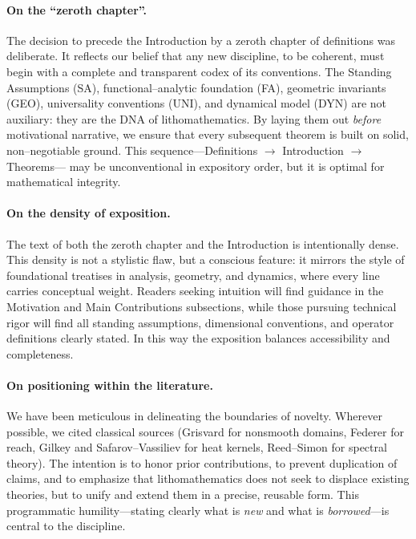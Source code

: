 \paragraph{On the ``zeroth chapter''.}
The decision to precede the Introduction by a zeroth chapter 
of definitions was deliberate. 
It reflects our belief that any new discipline, to be coherent, 
must begin with a complete and transparent codex of its conventions. 
The Standing Assumptions (SA), functional–analytic foundation (FA), 
geometric invariants (GEO), universality conventions (UNI), 
and dynamical model (DYN) are not auxiliary: 
they are the DNA of lithomathematics. 
By laying them out \emph{before} motivational narrative, 
we ensure that every subsequent theorem is built on solid, 
non–negotiable ground. 
This sequence—Definitions $\to$ Introduction $\to$ Theorems— 
may be unconventional in expository order, 
but it is optimal for mathematical integrity. 

\paragraph{On the density of exposition.}
The text of both the zeroth chapter and the Introduction is intentionally dense. 
This density is not a stylistic flaw, but a conscious feature: 
it mirrors the style of foundational treatises in analysis, 
geometry, and dynamics, where every line carries conceptual weight. 
Readers seeking intuition will find guidance in the 
Motivation and Main Contributions subsections, 
while those pursuing technical rigor will find all 
standing assumptions, dimensional conventions, and operator definitions 
clearly stated. 
In this way the exposition balances accessibility and completeness. 

\paragraph{On positioning within the literature.}
We have been meticulous in delineating the boundaries of novelty. 
Wherever possible, we cited classical sources 
(Grisvard for nonsmooth domains, Federer for reach, 
Gilkey and Safarov–Vassiliev for heat kernels, 
Reed–Simon for spectral theory). 
The intention is to honor prior contributions, 
to prevent duplication of claims, 
and to emphasize that lithomathematics does not seek 
to displace existing theories, but to unify and extend them 
in a precise, reusable form. 
This programmatic humility—stating clearly what is \emph{new} 
and what is \emph{borrowed}—is central to the discipline. 

